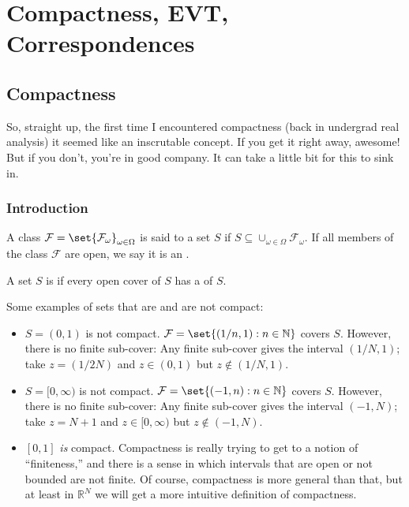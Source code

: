\documentclass{article}
\begin{document}
\displayoptions

\section{Compactness, EVT, Correspondences}
\label{sec:compactness_evt_correspondences}

\localtableofcontents

\subsection{Compactness}
\label{sub:compactness}

So, straight up, the first time I encountered compactness (back in undergrad real analysis) it seemed like an inscrutable concept. If you get it right away, awesome! But if you don't, you're in good company. It can take a little bit for this to sink in.

\subsubsection{Introduction}
\label{ssub:introduction}

\begin{definition}[cover]\label{def:lecture3_compactness_cover}
  A class $\mathcal{F} = \set{\mathcal{F}_\omega}_{\omega \in \Omega}$ is said to  a set $S$ if $S \subseteq \cup_{\omega \in \Omega} \mathcal{F}_\omega$. If all members of the class $\mathcal{F}$ are open, we say it is an .
\end{definition}

\begin{definition}[compactness]\label{def:lecture3_compactness_compact}
  A set $S$ is  if every open cover of $S$ has a  of $S$.
\end{definition}

Some examples of sets that are and are not compact:
\begin{itemize}[label=$\bullet$]
  \item $S = (0, 1)$ is not compact. $\mathcal{F} = \set{(1/n, 1): n \in \mathbb{N}}$ covers $S$. However, there is no finite sub-cover: Any finite sub-cover gives the interval $(1/N, 1)$; take $z = (1/2N)$ and $z \in (0, 1)$ but $z \notin (1/N, 1)$.

  \item $S = [0, \infty)$ is not compact. $\mathcal{F} = \set{(-1, n): n \in \mathbb{N}}$ covers $S$. However, there is no finite sub-cover: Any finite sub-cover gives the interval $(-1, N)$; take $z = N + 1$ and $z \in [0, \infty)$ but $z \notin (-1, N)$.

  \item $[0, 1]$ \textit{is} compact. Compactness is really trying to get to a notion of ``finiteness,'' and there is a sense in which intervals that are open or not bounded are not finite. Of course, compactness is more general than that, but at least in $\mathbb{R}^N$ we will get a more intuitive definition of compactness.
\end{itemize}
\end{document}
